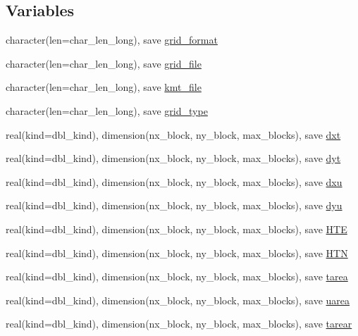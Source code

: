 \subsection*{Variables}
\begin{DoxyCompactItemize}
\item 
character(len=char\_\-len\_\-long), save \hyperlink{namespaceice__grid_af3bcebba9676775105d70d32996d3ce5}{grid\_\-format}
\item 
character(len=char\_\-len\_\-long), save \hyperlink{namespaceice__grid_ac080d4ddf9dfc9375611416d1c425155}{grid\_\-file}
\item 
character(len=char\_\-len\_\-long), save \hyperlink{namespaceice__grid_a21b896a78dcb089ba19cddd8a763ec94}{kmt\_\-file}
\item 
character(len=char\_\-len\_\-long), save \hyperlink{namespaceice__grid_a927cd355e5ebbeb5b943262b4d8a1c74}{grid\_\-type}
\item 
real(kind=dbl\_\-kind), dimension(nx\_\-block, ny\_\-block, max\_\-blocks), save \hyperlink{namespaceice__grid_a42016e793e21df58800428163f3eac13}{dxt}
\item 
real(kind=dbl\_\-kind), dimension(nx\_\-block, ny\_\-block, max\_\-blocks), save \hyperlink{namespaceice__grid_ae46b1f5dbbef49a552a33a86b1f887b8}{dyt}
\item 
real(kind=dbl\_\-kind), dimension(nx\_\-block, ny\_\-block, max\_\-blocks), save \hyperlink{namespaceice__grid_a9fecdcb5623bfc308ef4f2ddb4d284b6}{dxu}
\item 
real(kind=dbl\_\-kind), dimension(nx\_\-block, ny\_\-block, max\_\-blocks), save \hyperlink{namespaceice__grid_ad2b38c10d13244b2b4da1e461c2ef207}{dyu}
\item 
real(kind=dbl\_\-kind), dimension(nx\_\-block, ny\_\-block, max\_\-blocks), save \hyperlink{namespaceice__grid_a881253aa819ce18c46c4bffb3d558616}{HTE}
\item 
real(kind=dbl\_\-kind), dimension(nx\_\-block, ny\_\-block, max\_\-blocks), save \hyperlink{namespaceice__grid_a6d5e0411ab66c52d72c0bcc75f794eab}{HTN}
\item 
real(kind=dbl\_\-kind), dimension(nx\_\-block, ny\_\-block, max\_\-blocks), save \hyperlink{namespaceice__grid_af9d3e2476e44dd679c4062b370f21ffa}{tarea}
\item 
real(kind=dbl\_\-kind), dimension(nx\_\-block, ny\_\-block, max\_\-blocks), save \hyperlink{namespaceice__grid_aa8008e6fedd2e53d57bee5d6fa898de9}{uarea}
\item 
real(kind=dbl\_\-kind), dimension(nx\_\-block, ny\_\-block, max\_\-blocks), save \hyperlink{namespaceice__grid_ab853acbf3fa50d832ffed201f760ef88}{tarear}

\end{DoxyCompactItemize}
